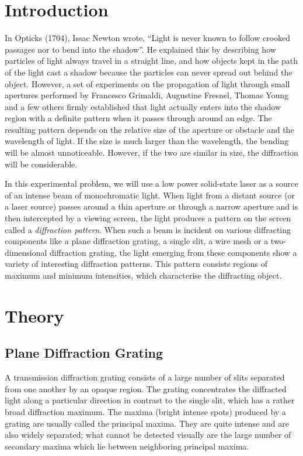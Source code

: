 \section*{Introduction}
	 
In Opticks (1704), Issac Newton wrote, ``Light is never known to follow crooked passages nor to bend into the shadow''. He explained this by describing how particles of light always travel in a straight line, and how objects kept in the path of the light cast a shadow because the particles can never spread out behind the object. However, a set of experiments on the propagation of light through small apertures performed by Francesco Grimaldi, Augustine Fresnel, Thomas Young and a few others firmly established that light actually enters into the shadow region with a definite pattern when it passes through around an edge. The resulting pattern depends on the relative size of the aperture or obstacle and the wavelength of light. If the size is much larger than the wavelength, the bending will be almost unnoticeable. However, if the two are similar in size, the diffraction will be considerable.    
     
In this experimental problem, we will use a low power solid-state laser as a source of an intense beam of monochromatic light. When light from a distant source (or a laser source) passes around a thin aperture or through a narrow aperture and is then intercepted by a viewing screen, the light produces a pattern on the screen called a \textit{diffraction pattern}. When such a beam is incident on various diffracting components like a plane diffraction grating, a single slit, a wire mesh or a two-dimensional diffraction grating, the light emerging from these components show a variety of interesting diffraction patterns. This pattern consists regions of maximum and minimum intensities, which characterise the diffracting object. 

\section*{Theory}

\subsection*{Plane Diffraction Grating}

A transmission diffraction grating consists of a large number of slits separated from one another by an opaque region. The grating concentrates the diffracted light along a particular direction in contrast to the single slit, which has a rather broad diffraction maximum. The maxima (bright intense spots) produced by a grating are usually called the principal maxima. They are quite intense and are also widely separated; what cannot be detected visually are the large number of secondary maxima which lie between neighboring principal maxima.

